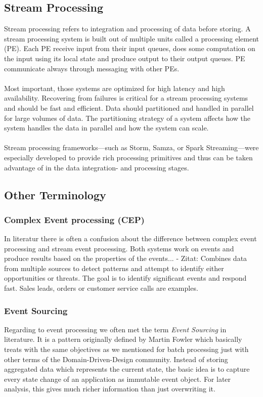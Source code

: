 \subsection{Stream Processing}
\label{intro-datastream-streamprocessing}
Stream processing refers to integration and processing of data before storing. 
A stream processing system is built out of multiple units called a processing
element (PE). Each PE receive input from their input queues, does some
computation on the input using its local state and produce output to their
output queues. PE communicate always through messaging with other PEs. 
\\ \\
Most important, those systems are optimized for high latency and high
availability. Recovering from failures is critical for a stream processing
systems and should be fast and efficient. 
Data should partitioned and handled in parallel for large volumes of data. 
The partitioning strategy of a system  affects how the system
handles the data in parallel and how the system can scale. 
\cite{PrpSvyOfDSPS}
\\ \\
Stream processing frameworks---such as Storm, Samza, or Spark
Streaming---were especially developed to provide rich processing primitives and thus can be taken advantage of
in the data integration- and processing stages.

\subsection{Other Terminology}
\subsubsection{Complex Event processing (CEP)}
In literatur there is often a confusion about the difference between
complex event processing and stream event processing. Both systems work on
events and produce results based on the properties of the events... 
- Zitat: Combines data from multiple sources  to detect patterns and attempt to
identify either opportunities or threats. The goal is to identify significant
events and respond fast. Sales leads, orders or customer service calls are
examples.\\


\subsubsection{Event Sourcing}
\label{event-sourcing}
Regarding to event processing we often met the term \textit{Event Sourcing} in
literature. It is a pattern originally defined by Martin Fowler which basically
treats with the same objectives as we mentioned for batch processing just with
other terms of the Domain-Driven-Design community. Instead of storing aggregated
data which represents the current state, the basic idea is to capture
every state change of an application as immutable event object. For later
analysis, this gives much richer information than just overwriting it. 

